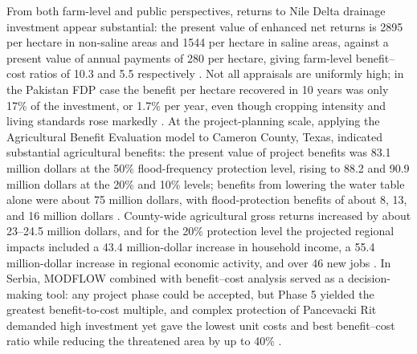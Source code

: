 From both farm-level and public perspectives, returns to Nile Delta drainage investment appear substantial: the present value of enhanced net returns is 2895 per hectare in non-saline areas and 1544 per hectare in saline areas, against a present value of annual payments of 280 per hectare, giving farm-level benefit--cost ratios of 10.3 and 5.5 respectively \parencite{Wichelns2002}. Not all appraisals are uniformly high; in the Pakistan FDP case the benefit per hectare recovered in 10 years was only 17\% of the investment, or 1.7\% per year, even though cropping intensity and living standards rose markedly \parencite{Ghumman2011}. At the project-planning scale, applying the Agricultural Benefit Evaluation model to Cameron County, Texas, indicated substantial agricultural benefits: the present value of project benefits was 83.1 million dollars at the 50\% flood-frequency protection level, rising to 88.2 and 90.9 million dollars at the 20\% and 10\% levels; benefits from lowering the water table alone were about 75 million dollars, with flood-protection benefits of about 8, 13, and 16 million dollars \parencite{ROBINSON1992}. County-wide agricultural gross returns increased by about 23--24.5 million dollars, and for the 20\% protection level the projected regional impacts included a 43.4 million-dollar increase in household income, a 55.4 million-dollar increase in regional economic activity, and over 46 new jobs \parencite{ROBINSON1992}. In Serbia, MODFLOW combined with benefit--cost analysis served as a decision-making tool: any project phase could be accepted, but Phase 5 yielded the greatest benefit-to-cost multiple, and complex protection of Pancevacki Rit demanded high investment yet gave the lowest unit costs and best benefit--cost ratio while reducing the threatened area by up to 40\% \parencite{Bozic2014}.

